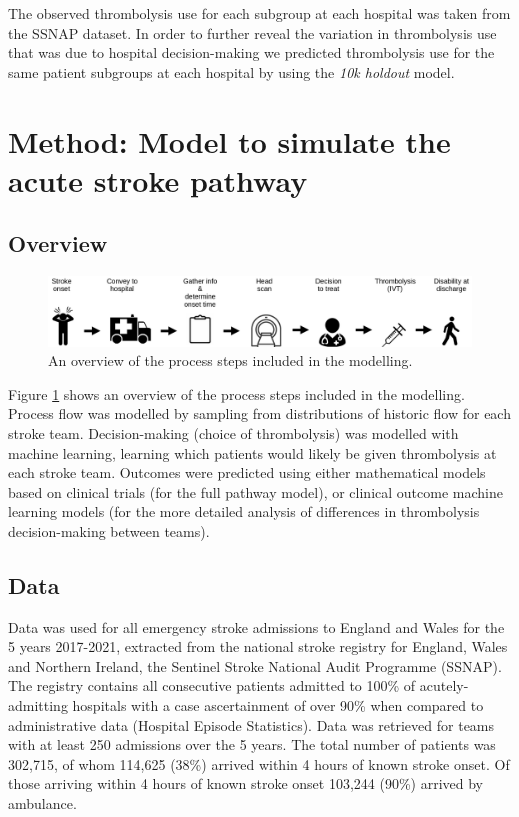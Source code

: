 The observed thrombolysis use for each subgroup at each hospital was taken from the SSNAP dataset. In order to further reveal the variation in thrombolysis use that was due to hospital decision-making we predicted thrombolysis use for the same patient subgroups at each hospital by using the \emph{10k holdout} model.






\section{Method: Model to simulate the acute stroke pathway}

\subsection{Overview}

\begin{figure}
    \centering
    \includegraphics[width=1.0\linewidth]{images/flow}
    \caption{An overview of the process steps included in the modelling.}
    \label{fig:flow}
\end{figure}

Figure \ref{fig:flow} shows an overview of the process steps included in the modelling. Process flow was modelled by sampling from distributions of historic flow for each stroke team. Decision-making (choice of thrombolysis) was modelled with machine learning, learning which patients would likely be given thrombolysis at each stroke team. Outcomes were predicted using either mathematical models based on clinical trials (for the full pathway model), or clinical outcome machine learning models (for the more detailed analysis of differences in thrombolysis decision-making between teams).

\subsection{Data}

Data was used for all emergency stroke admissions to England and Wales for the 5 years 2017-2021, extracted from the national stroke registry for England, Wales and Northern Ireland, the Sentinel Stroke National Audit Programme (SSNAP). The registry contains all consecutive patients admitted to 100\% of acutely-admitting hospitals with a case ascertainment of over 90\% when compared to administrative data (Hospital Episode Statistics). Data was retrieved for teams with at least 250 admissions over the 5 years. The total number of patients was 302,715, of whom 114,625 (38\%) arrived within 4 hours of known stroke onset. Of those arriving within 4 hours of known stroke onset 103,244 (90\%) arrived by ambulance.

